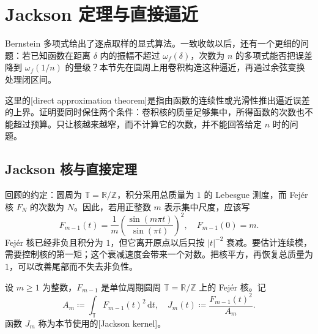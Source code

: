 \section{Jackson 定理与直接逼近}
\label{b2:sec:approximation-jackson}
\label{b2:sec:0209}

Bernstein 多项式给出了逐点取样的显式算法。一致收敛以后，还有一个更细的问题：若已知函数在距离 \(\delta\) 内的振幅不超过 \(\omega_f(\delta)\)，次数为 \(n\) 的多项式能否把误差降到 \(\omega_f(1/n)\) 的量级？本节先在圆周上用卷积构造这种逼近，再通过余弦变换处理闭区间。

\ProseParagraphBreak

这里的[direct approximation theorem]是指由函数的连续性或光滑性推出逼近误差的上界。证明要同时保住两个条件：卷积核的质量足够集中，所得函数的次数也不能超过预算。只让核越来越窄，而不计算它的次数，并不能回答给定 \(n\) 时的问题。

\subsection{Jackson 核与直接定理}
\label{b2:subsec:020902}

回顾的约定：圆周为 \(\mathbb T=\mathbb R/\mathbb Z\)，积分采用总质量为 \(1\) 的 Lebesgue 测度，而 Fejér 核 \(F_N\) 的次数为 \(N\)。因此，若用正整数 \(m\) 表示集中尺度，应该写
\[
 F_{m-1}(t)=\frac1m
  \left(\frac{\sin(m\pi t)}{\sin(\pi t)}\right)^2,
 \quad F_{m-1}(0)=m.
\]
Fejér 核已经非负且积分为 \(1\)，但它离开原点以后只按 \(|t|^{-2}\) 衰减。要估计连续模，需要控制核的第一矩；这个衰减速度会带来一个对数。把核平方，再恢复总质量为 \(1\)，可以改善尾部而不失去非负性。

\begin{definition}
\label{b2:def:approximation-jackson-kernel}
设 \(m\geq1\) 为整数，\(F_{m-1}\) 是单位周期圆周 \(\mathbb T=\mathbb R/\mathbb Z\) 上的 Fejér 核。记
\[
 A_m\coloneqq\int_{\mathbb T}F_{m-1}(t)^2\,\mathrm dt,
 \quad
 J_m(t)\coloneqq\frac{F_{m-1}(t)^2}{A_m}.
\]
函数 \(J_m\) 称为本节使用的[Jackson kernel]。
\end{definition}


